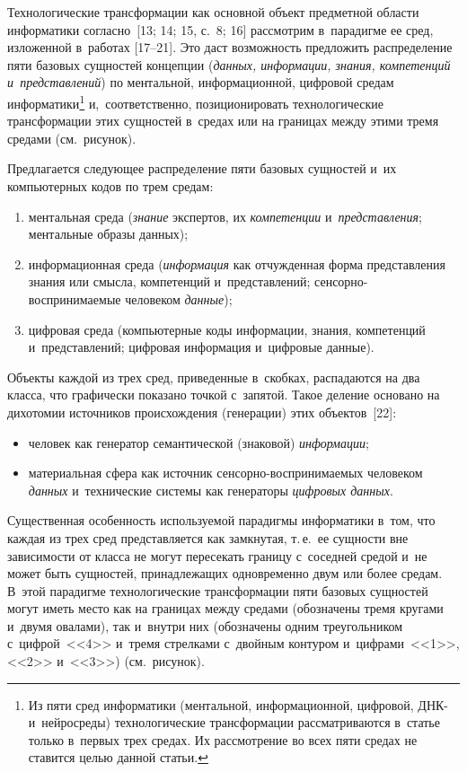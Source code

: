 \begin{multicols}{2}
Технологические трансформации как основной объект предметной области 
информатики согласно~[13; 14; 15, с.~8; 16] рассмотрим в~парадигме ее сред, 
изложенной в~работах [17--21]. Это даст возможность предложить распределение 
пяти базовых сущностей концепции (\textit{данных, информации, знания, 
компетенций и~представлений}) по ментальной, информационной, цифровой 
средам информатики\footnote{Из пяти сред информатики (ментальной, информационной, 
цифровой, ДНК- и~нейросреды) технологические трансформации рассматриваются в~статье только 
в~первых трех средах. Их рассмотрение во всех пяти средах не ставится целью данной статьи.} 
и,~соответственно, позиционировать технологические трансформации этих 
сущностей в~средах или на границах между этими тремя средами (см.\ рисунок).

Предлагается следующее распределение пяти базовых сущностей и~их 
компьютерных кодов по трем средам:
\begin{enumerate}[(1)]
\item ментальная среда (\textit{знание} экспертов, их \textit{компетенции} 
и~\textit{представления}; ментальные образы данных);
\item информационная среда (\textit{информация} как от\-чуж\-ден\-ная форма 
представления знания или смыс\-ла, компетенций и~представлений;  
сен\-сор\-но-вос\-при\-ни\-ма\-емые человеком \textit{данные});
\item цифровая среда (компьютерные коды информации, знания, компетенций 
и~представлений; цифровая информация и~цифровые данные).
\end{enumerate}

Объекты каждой из трех сред, приведенные в~скобках, распадаются на два класса, 
что графически показано точкой с~запятой. Такое деление основано на дихотомии 
источников происхождения (генерации) этих объектов~[22]:
\begin{itemize}
\item человек как генератор семантической (знаковой) \textit{информации};
\item материальная сфера как источник сен\-сор\-но-вос\-при\-ни\-ма\-емых 
человеком \textit{данных} и~технические системы как генераторы \textit{цифровых 
данных}.
\end{itemize}

Существенная особенность используемой парадигмы информатики в~том, что 
каждая из трех сред представляется как замкнутая, т.\,е.\ ее сущности вне 
зависимости от класса не могут пересекать границу с~соседней средой и~не 
может быть сущностей, принадлежащих одновременно двум или более средам. 
В~этой парадигме технологические трансформации пяти базовых сущностей 
могут иметь место как на границах между средами (обозначены тремя кругами 
и~двумя овалами), так и~внутри них (обозначены одним треугольником 
с~цифрой~<<4>> и~тремя стрелками с~двойным контуром и~цифрами~<<1>>, 
<<2>> и~<<3>>) (см.\ рисунок).




\end{multicols}
